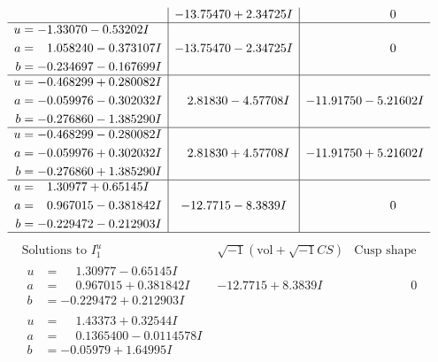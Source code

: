 \documentclass[1p]{elsarticle_modified}
\theoremstyle{definition}
\newcommand{\I}{\sqrt{-1}}
\begin{document}
$$\begin{array}{c|c|c}
 & -13.75470 + 2.34725 I & \phantom{-0.000000 } 0 \\ \hline\begin{aligned}
u &= -1.33070 - 0.53202 I \\
a &= \phantom{-}1.058240 - 0.373107 I \\
b &= -0.234697 - 0.167699 I\end{aligned}
 & -13.75470 - 2.34725 I & \phantom{-0.000000 } 0 \\ \hline\begin{aligned}
u &= -0.468299 + 0.280082 I \\
a &= -0.059976 - 0.302032 I \\
b &= -0.276860 - 1.385290 I\end{aligned}
 & \phantom{-}2.81830 - 4.57708 I & -11.91750 - 5.21602 I \\ \hline\begin{aligned}
u &= -0.468299 - 0.280082 I \\
a &= -0.059976 + 0.302032 I \\
b &= -0.276860 + 1.385290 I\end{aligned}
 & \phantom{-}2.81830 + 4.57708 I & -11.91750 + 5.21602 I \\ \hline\begin{aligned}
u &= \phantom{-}1.30977 + 0.65145 I \\
a &= \phantom{-}0.967015 - 0.381842 I \\
b &= -0.229472 - 0.212903 I\end{aligned}
 & -12.7715 - 8.3839 I & \phantom{-0.000000 } 0\\
 \hline 
 \end{array}$$\newpage$$\begin{array}{c|c|c}  
\text{Solutions to }I^u_{1}& \I (\text{vol} + \sqrt{-1}CS) & \text{Cusp shape}\\
 \hline 
\begin{aligned}
u &= \phantom{-}1.30977 - 0.65145 I \\
a &= \phantom{-}0.967015 + 0.381842 I \\
b &= -0.229472 + 0.212903 I\end{aligned}
 & -12.7715 + 8.3839 I & \phantom{-0.000000 } 0 \\ \hline\begin{aligned}
u &= \phantom{-}1.43373 + 0.32544 I \\
a &= \phantom{-}0.1365400 - 0.0114578 I \\
b &= -0.05979 + 1.64995 I\end{aligned}

\end{array}$$
\end{document}
